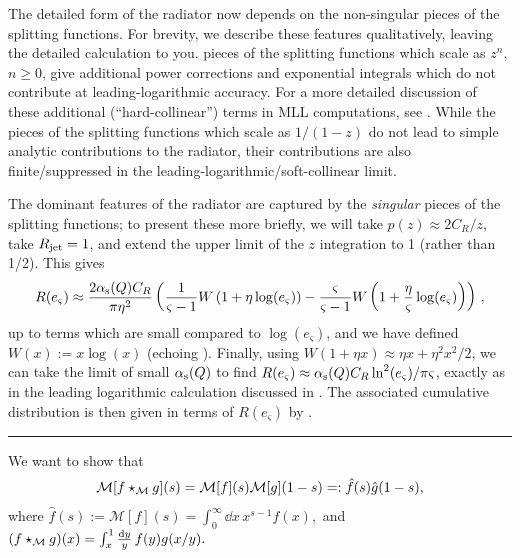 The detailed form of the radiator now depends on the non-singular pieces of the splitting functions.
%
For brevity, we describe these features qualitatively, leaving the detailed calculation to you.
%
pieces of the splitting functions which scale as \(z^n\), \(n \geq 0\), give additional power corrections and exponential integrals which do not contribute at leading-logarithmic accuracy.
%
For a more detailed discussion of these additional (``hard-collinear'') terms in MLL computations, see .
%
While the pieces of the splitting functions which scale as \(1/(1-z)\) do not lead to simple analytic contributions to the radiator, their contributions are also finite/suppressed in the leading-logarithmic/soft-collinear limit.

The dominant features of the radiator are captured by the \textit{singular} pieces of the splitting functions;
%
to present these more briefly, we will take \(p(z) \approx 2 C_{R} / z\), take \(R_\text{jet} = 1\), and extend the upper limit of the \(z\) integration to 1 (rather than 1/2).
%
This gives
\begin{align}
    R(e_\varsigma)
    \approx
    \frac{2 \alpha_{\mathrm{s}}(Q) C_R}{\pi \eta^2}
    \left(
        \frac{1}{\varsigma-1}
        W\left(1 + \eta \log(e_\varsigma)\right)
        -
        \frac{\varsigma}{\varsigma-1}
        W\left(1 + \frac{\eta}{\varsigma} \log(e_\varsigma)\right)
    \right)
    \,,
\end{align}
up to terms which are small compared to \(\log(e_\varsigma)\), and we have defined \(W(x) := x\log(x)\) (echoing ).
%
Finally, using \(W(1 + \eta x) \approx \eta x + \eta^2 x^2/2\), we can take the limit of small \(\alpha_{\mathrm{s}}(Q)\) to find \(R(e_\varsigma) \approx \alpha_{\mathrm{s}}(Q) C_R \ln^2(e_\varsigma) / \pi \varsigma\), exactly as in the leading logarithmic calculation discussed in .
%
The associated cumulative distribution is then given in terms of \(R(e_\varsigma)\) by .




\vspace{10pt}
\hrule
\vspace{10pt}



We want to show that
\begin{align}
    \mathcal M[f \star_{\mathcal M} g](s) = \mathcal M[f](s) \mathcal M[g](1-s)
    =: \hat{f}(s) \hat{g}(1-s)
    ,
\end{align}
where
\(
    \hat{f}(s) := \mathcal{M}[f](s) = \int_0^\infty \dd x\, x^{s-1} f(x)
    ,
\)
and
\(
    (f \star_{\mathcal M} g)(x)
    =
    \int_x^1 \frac{\dd y}{y}\, f(y) g(x/y)
    .
\)

